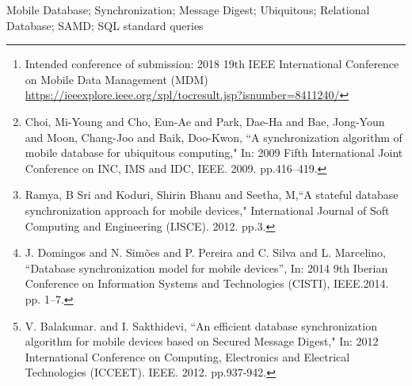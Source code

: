 \documentclass[conference]{IEEEtran}
\begin{document}
\begin{abstract}

\footnote{Intended conference of submission: 2018 19th IEEE International Conference on Mobile Data Management (MDM) \url{https://ieeexplore.ieee.org/xpl/tocresult.jsp?isnumber=8411240/}}
\footnote{Choi, Mi-Young and Cho, Eun-Ae and Park, Dae-Ha and Bae, Jong-Youn and Moon, Chang-Joo and Baik, Doo-Kwon, ``A synchronization algorithm of mobile database for ubiquitous computing," In: 2009 Fifth International Joint Conference on INC, IMS and IDC, IEEE. 2009. pp.416--419.}
\footnote{Ramya, B Sri and Koduri, Shirin Bhanu and Seetha, M,``A stateful database synchronization approach for mobile devices," International Journal of Soft Computing and Engineering (IJSCE). 2012. pp.3.}In the recent times, high performance small mobile devices like smart mobile phone, PDA, Pocket PC have rapidly came into use and are recognized as a popular client device in ``ubiquitous environment". Since the existing synchronization solutions of mobile database are not independent from the database server the use of database dependent information like meta-data is used.

The paper talks about the Synchronization Algorithm based on Message Digest (SAMD) which is a database synchronization algorithm for Mobile Devices. This model is based on message digests to \footnote{J. Domingos and N. Simões and P. Pereira and C. Silva and L. Marcelino, ``Database synchronization model for mobile devices'', In: 2014 9th Iberian Conference on Information Systems and Technologies (CISTI), IEEE.2014. pp. 1--7.}synchronize relational databases between mobile devices and a server, in order to minimize the data transferred between the device and the server. SAMD resolves the problems mentioned above using only standard SQL queries. The paper also discusses about the SQL Anywhere, which is served as a high-performance server which illustrates\footnote{V. Balakumar. and I. Sakthidevi, ``An efficient database synchronization algorithm for mobile devices based on Secured Message Digest," In: 2012 International Conference on Computing, Electronics and Electrical Technologies (ICCEET). IEEE. 2012. pp.937-942.}  how various self-management features work in concert to provide a robust data management solution in zero-administration environments. 
\end{abstract}


\begin{IEEEkeywords}

Mobile Database; Synchronization; Message Digest; Ubiquitous; Relational Database; SAMD; SQL standard queries 
\end{IEEEkeywords}
\end{document}
